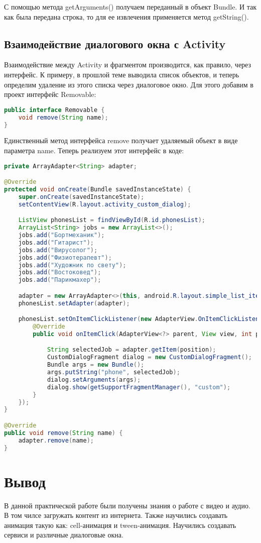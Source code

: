 С помощью метода getArguments() получаем переданный в
объект Bundle. И так как была передана строка, то для ее извлечения
применяется метод getString().

\subsection{Взаимодействие диалогового окна с Activity}
Взаимодействие между Activity и фрагментом производится, как правило,
через интерфейс. К примеру, в прошлой теме выводила список
объектов, и теперь определим удаление из этого списка через диалоговое
окно.
Для этого добавим в проект интерфейс Removable:

\begin{lstlisting}[language=Java
	, label=lst:
	]
public interface Removable {
	void remove(String name);
}
\end{lstlisting}

Единственный метод интерфейса remove получает удаляемый объект в виде
параметра name.
Теперь реализуем этот интерфейс в коде:

\begin{lstlisting}[language=Java
	, label=lst:
	]
private ArrayAdapter<String> adapter;

@Override
protected void onCreate(Bundle savedInstanceState) {
	super.onCreate(savedInstanceState);
	setContentView(R.layout.activity_custom_dialog);

	ListView phonesList = findViewById(R.id.phonesList);
	ArrayList<String> jobs = new ArrayList<>();
	jobs.add("Бортмеханик");
	jobs.add("Гитарист");
	jobs.add("Вирусолог");
	jobs.add("Физиотерапевт");
	jobs.add("Художник по свету");
	jobs.add("Востоковед");
	jobs.add("Парикмахер");

	adapter = new ArrayAdapter<>(this, android.R.layout.simple_list_item_1, jobs);
	phonesList.setAdapter(adapter);

	phonesList.setOnItemClickListener(new AdapterView.OnItemClickListener() {
		@Override
		public void onItemClick(AdapterView<?> parent, View view, int position, long id) {

			String selectedJob = adapter.getItem(position);
			CustomDialogFragment dialog = new CustomDialogFragment();
			Bundle args = new Bundle();
			args.putString("phone", selectedJob);
			dialog.setArguments(args);
			dialog.show(getSupportFragmentManager(), "custom");
		}
	});
}

@Override
public void remove(String name) {
	adapter.remove(name);
}
\end{lstlisting}

\clearpage

\section*{\LARGE{Вывод}}
В данной практической работе были получены знания о работе с видео и аудио.
В том чилсе загружать контент из интернета.
Также научились создавать анимация такую как: cell-анимация и tween-анимация.
Научились создавать сервиси и различные диалоговые окна.


